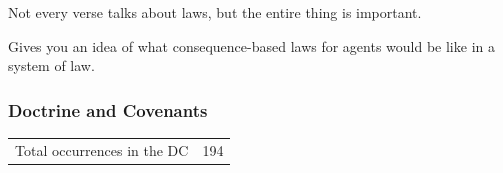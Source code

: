		\begin{compactdesc}
			\item[{\hyperref[2NEPHI-9-17]{2 Nephi 9:17}}]
			\item[{\hyperref[ALMA-42]{Alma 42}}] \phantom{.}
				\begin{compactitem}
					\item Not every verse talks about laws, but the entire thing is important.
				\end{compactitem} 
			\item[{\hyperref[HELAMAN-6-24]{Helaman 6:24}}] \phantom{.}
				\begin{compactitem}
					\item Gives you an idea of what consequence-based laws for agents would be like in a system of law.
				\end{compactitem}
		\end{compactdesc}
		
	\subsubsection{Doctrine and Covenants} %
		\label{LAW-DC}
	
		\begin{tabular}{ll}
			Total occurrences in the DC & 194
		\end{tabular}
		
